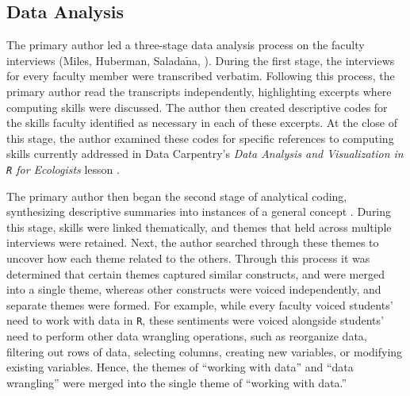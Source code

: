 \documentclass[12pt]{article}
\begin{document}

\subsection{Data Analysis} 

\quad The primary author led a three-stage data analysis process on the faculty interviews (Miles, 
Huberman, Salada$\tilde{\text{n}}$a, \citeyear{miles}). During the first stage,
the interviews for every faculty member were transcribed verbatim. Following 
this process, the primary author read the transcripts independently, 
highlighting excerpts where computing skills were discussed. The author then 
created descriptive codes for the skills faculty identified as necessary in each
of these excerpts. At the close of this stage, the author examined these codes 
for specific references to computing skills currently addressed in Data 
Carpentry's \emph{Data Analysis and Visualization in \texttt{R} for Ecologists} 
lesson \citep{ecology_curriculum}. 


\quad The primary author then began the second stage of 
analytical coding, synthesizing descriptive summaries into instances of a
general concept \citep[p.\ 95]{miles}. During this stage, skills were linked
thematically, and themes that held across multiple interviews were retained.
Next, the author searched through these themes to uncover how each theme related
to the others. Through this process it was determined that certain themes 
captured similar constructs, and were merged into a single theme, whereas other
constructs were voiced independently, and separate themes were formed. For
example, while every faculty voiced students' need to work with data in 
\texttt{R}, these sentiments were voiced alongside students' need to perform
other data wrangling operations, such as reorganize data, filtering out rows of
data, selecting columns, creating new variables, or modifying existing
variables. Hence, the themes of ``working with data'' and ``data wrangling''
were merged into the single theme of ``working with data.'' 
\end{document}

